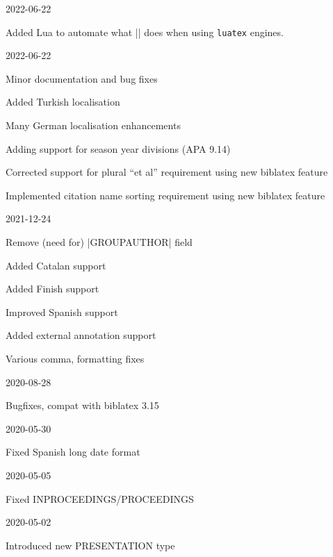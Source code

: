 \documentclass{ltxdockit}
\begin{document}
\begin{changelog}

\begin{release}{9.16}{2022-06-22}
\item Added Lua to automate what |\nptextcite| does when using
  \texttt{luatex} engines.
\end{release}

\begin{release}{9.16}{2022-06-22}
\item Minor documentation and bug fixes
\item Added Turkish localisation
\item Many German localisation enhancements
\item Adding support for season year divisions (APA 9.14)
\item Corrected support for plural ``et al'' requirement using new biblatex
  feature
\item Implemented citation name sorting requirement using new biblatex feature
\end{release}
  
\begin{release}{9.15}{2021-12-24}
\item Remove (need for) |GROUPAUTHOR| field
\item Added Catalan support
\item Added Finish support
\item Improved Spanish support
\item Added external annotation support
\item Various comma, formatting fixes
\end{release}

\begin{release}{9.14}{2020-08-28}
\item Bugfixes, compat with biblatex 3.15
\end{release}

\begin{release}{9.13}{2020-05-30}
\item Fixed Spanish long date format
\end{release}
  
\begin{release}{9.12}{2020-05-05}
\item Fixed INPROCEEDINGS/PROCEEDINGS
\end{release}

\begin{release}{9.11}{2020-05-02}
\item Introduced new PRESENTATION type
\end{release}


\end{changelog}
\end{document}
